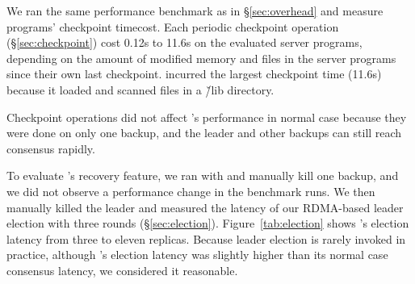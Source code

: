 

We ran the same performance benchmark as in \S\ref{sec:overhead} and measure 
programs' checkpoint timecost. Each \xxx periodic checkpoint operation 
(\S\ref{sec:checkpoint}) cost 0.12s to 11.6s on the evaluated server programs, 
depending on the amount of modified memory and files in the server programs 
since their own last checkpoint. \clamav incurred the largest checkpoint time 
(11.6s) because it loaded and scanned files in a \v{/lib} directory.

Checkpoint operations did not affect \xxx's performance in normal case because 
they were done on only one backup, and the leader and other backups can still 
reach consensus rapidly.

To evaluate \xxx's \paxos recovery feature, we ran \xxx with \redis and 
manually kill one backup, and we did not observe a performance change in the 
benchmark runs. We then manually killed the \xxx leader and measured the 
latency of our RDMA-based leader election with three rounds 
(\S\ref{sec:election}). Figure~\ref{tab:election} shows \xxx's election latency 
from three to eleven replicas. Because \paxos leader election is rarely 
invoked in practice, although \xxx's election latency was slightly higher than 
its normal case consensus latency, we considered it reasonable.





